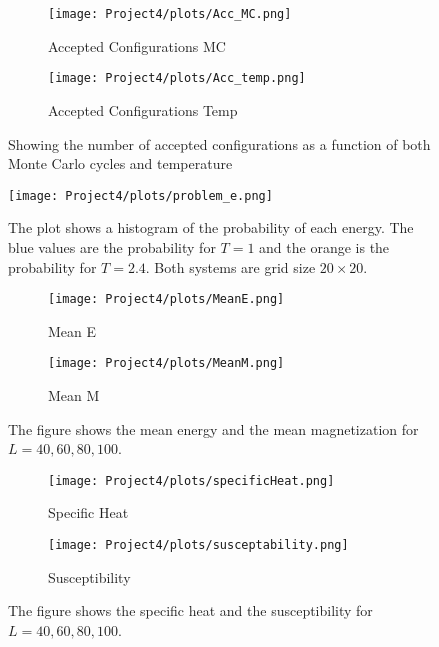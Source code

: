 \documentclass{article}
\begin{document}
\begin{figure}[H]
  \begin{subfigure}[b]{0.6\textwidth}
    \texttt{[image: Project4/plots/Acc\_MC.png]}
    \caption{Accepted Configurations MC}
    \label{fig:accMC}
  \end{subfigure}
  \hfill
  \begin{subfigure}[b]{0.6\textwidth}
    \texttt{[image: Project4/plots/Acc\_temp.png]}
    \caption{Accepted Configurations Temp}
    \label{fig:accTemp}
  \end{subfigure}
  \caption{Showing the number of accepted configurations as a function of both Monte Carlo cycles and temperature}
\end{figure}

\begin{figure}[H]
    \centering
    \texttt{[image: Project4/plots/problem\_e.png]}
    \caption{The plot shows a histogram of the probability of each energy. The blue values are the probability for $T = 1$ and the orange is the probability for $T = 2.4$. Both systems are grid size $20\times 20$.}
    \label{fig:prob}
\end{figure}

\begin{figure}[H]
  \begin{subfigure}[b]{0.6\textwidth}
    \texttt{[image: Project4/plots/MeanE.png]}
    \caption{Mean E}
    \label{fig:meanE}
  \end{subfigure}
  \hfill
  \begin{subfigure}[b]{0.6\textwidth}
    \texttt{[image: Project4/plots/MeanM.png]}
    \caption{Mean M}
    \label{fig:meanM}
  \end{subfigure}
  \caption{The figure shows the mean energy and the mean magnetization for $L = 40, 60, 80, 100$.}
\end{figure}

\begin{figure}[H]
  \begin{subfigure}[b]{0.6\textwidth}
    \texttt{[image: Project4/plots/specificHeat.png]}
    \caption{Specific Heat}
    \label{fig:heat}
  \end{subfigure}
  \hfill
  \begin{subfigure}[b]{0.6\textwidth}
    \texttt{[image: Project4/plots/susceptability.png]}
    \caption{Susceptibility}
    \label{fig:susc}
  \end{subfigure}
  \caption{The figure shows the specific heat and the susceptibility for $L = 40, 60, 80, 100$.}
\end{figure}
\end{document}
